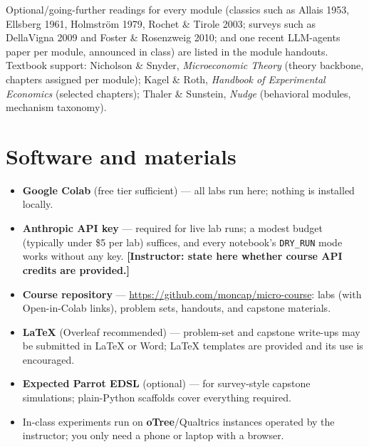 \documentclass[11pt]{article}
\begin{document}
\noindent Optional/going-further readings for every module (classics
such as Allais 1953, Ellsberg 1961, Holmstr\"om 1979, Rochet \& Tirole
2003; surveys such as DellaVigna 2009 and Foster \& Rosenzweig 2010;
and one recent LLM-agents paper per module, announced in class) are
listed in the module handouts. Textbook support: Nicholson \& Snyder,
\emph{Microeconomic Theory} (theory backbone, chapters assigned per
module); Kagel \& Roth, \emph{Handbook of Experimental Economics}
(selected chapters); Thaler \& Sunstein, \emph{Nudge} (behavioral
modules, mechanism taxonomy).

\section*{Software and materials}
\begin{itemize}[nosep]
  \item \textbf{Google Colab} (free tier sufficient) --- all labs run
        here; nothing is installed locally.
  \item \textbf{Anthropic API key} --- required for live lab runs; a
        modest budget (typically under \$5 per lab) suffices, and
        every notebook's \texttt{DRY\_RUN} mode works without any key.
        \textbf{[Instructor: state here whether course API credits are
        provided.]}
  \item \textbf{Course repository} ---
        \url{https://github.com/moncap/micro-course}: labs (with
        Open-in-Colab links), problem sets, handouts, and capstone
        materials.
  \item \textbf{LaTeX} (Overleaf recommended) --- problem-set and
        capstone write-ups may be submitted in LaTeX or Word; LaTeX
        templates are provided and its use is encouraged.
  \item \textbf{Expected Parrot EDSL} (optional) --- for
        survey-style capstone simulations; plain-Python scaffolds
        cover everything required.
  \item In-class experiments run on \textbf{oTree}/Qualtrics
        instances operated by the instructor; you only need a phone or
        laptop with a browser.
\end{itemize}
\end{document}
